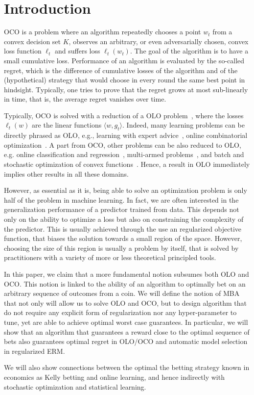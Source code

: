 \section{Introduction}
\label{sec:intro}

\acresetall

\ac{OCO} is a problem where an algorithm repeatedly chooses a point $w_t$ from a convex decision set $K$, observes an arbitrary, or even adversarially chosen, convex loss function $\ell_t$ and suffers loss $\ell_t(w_t)$. The goal of the algorithm is to have a small cumulative loss. Performance of an algorithm is evaluated by the so-called regret, which is the difference of cumulative losses of the algorithm and of the (hypothetical) strategy that would choose in every round the same best point in hindsight.
Typically, one tries to prove that the regret grows at most sub-linearly in time, that is, the average regret vanishes over time.

Typically, \ac{OCO} is solved with a reduction of a \ac{OLO} problem~\citep{Cesa-BianchiL06,Shalev-Shwartz12}, where the losses $\ell_t(w)$ are the linear functions $\langle w, g_t\rangle$.
Indeed, many learning problems can be directly phrased as \ac{OLO}, e.g., learning with expert advice~\citep{LittlestoneW94,Vovk98,Cesa-BianchiFHHSW97}, online combinatorial optimization~\cite{KoolenWK10}. A part from \ac{OCO}, other problems can be also reduced to \ac{OLO}, e.g. online classification and regression~\citep[Chapters~11~and~12]{Cesa-BianchiL06}, multi-armed problems~\citep[Chapter~6]{Cesa-BianchiL06}, and batch and stochastic optimization of convex functions~\cite{NemirovskyY83}.  Hence, a result in \ac{OLO} immediately implies other results in all these domains.

However, as essential as it is, being able to solve an optimization problem is only half of the problem in machine learning. In fact, we are often interested in the generalization performance of a predictor trained from data. This depends not only on the ability to optimize a loss but also on constraining the complexity of the predictor. This is usually achieved through the use an regularized objective function, that biases the solution towards a small region of the space. However, choosing the size of this region is usually a problem by itself, that is solved by practitioners with a variety of more or less theoretical principled tools.

In this paper, we claim that a more fundamental notion subsumes both \ac{OLO} and \ac{OCO}. This notion is linked to the ability of an algorithm to optimally bet on an arbitrary sequence of outcomes from a coin. We will define the notion of \ac{MBA} that not only will allow us to solve \ac{OLO} and \ac{OCO}, but to design algorithm that do not require any explicit form of regularization nor any hyper-parameter to tune, yet are able to achieve optimal worst case guarantees. 
In particular, we will show that an algorithm that guarantees a reward close to the optimal sequence of bets also guarantees optimal regret in \ac{OLO}/\ac{OCO} and automatic model selection in regularized \ac{ERM}.

We will also show connections between the optimal the betting strategy known in economics as Kelly betting \citep{Kelly56} and online learning, and hence indirectly with stochastic optimization and statistical learning.